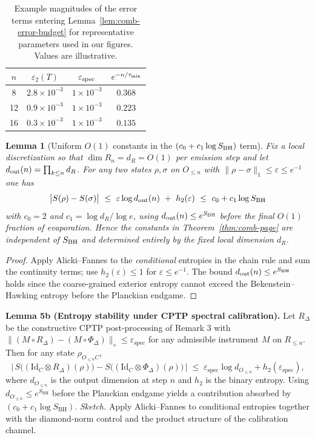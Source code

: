 \documentclass[aps,prd,preprint,onecolumn,superscriptaddress,nofootinbib,longbibliography,floatfix,11pt,showpacs,showkeys]{revtex4-2}
\theoremstyle{plain}
\newtheorem{lemma}[theorem]{Lemma}
\theoremstyle{definition}
\theoremstyle{remark}
\begin{document}
\begin{table}[t]
\centering
\caption{Example magnitudes of the error terms entering Lemma~\ref{lem:comb-error-budget} for representative parameters used in our figures.
Values are illustrative.}
\begin{tabular}{c|ccc}
\hline
$n$ & $\varepsilon_2(T)$ & $\varepsilon_{\rm spec}$ & $e^{-n/\tau_{\rm mix}}$ \\
\hline
8  & $2.8\times 10^{-3}$ & $1\times 10^{-3}$ & $0.368$ \\
12 & $0.9\times 10^{-3}$ & $1\times 10^{-3}$ & $0.223$ \\
16 & $0.3\times 10^{-3}$ & $1\times 10^{-3}$ & $0.135$ \\
\hline
\end{tabular}
\end{table}

\begin{lemma}[Uniform $O(1)$ constants in the $(c_0+c_1\log S_{\rm BH})$ term]\label{lem:log-constants}
Fix a local discretization so that $\dim R_n=d_R=O(1)$ per emission step and let $d_{\rm out}(n)=\prod_{k\le n} d_R$.
For any two states $\rho,\sigma$ on $O_{\le n}$ with $\|\rho-\sigma\|_1\le \varepsilon\le e^{-1}$ one has
\[
\big|S(\rho)-S(\sigma)\big|\ \le\ \varepsilon \log d_{\rm out}(n)\ +\ h_2(\varepsilon)\ \le\ c_0 + c_1 \log S_{\rm BH}
\]
with $c_0=2$ and $c_1=\log d_R/\log e$, using $d_{\rm out}(n)\le e^{S_{\rm BH}}$ before the final $O(1)$ fraction of evaporation.
Hence the constants in Theorem~\ref{thm:comb-page} are independent of $S_{\rm BH}$ and determined entirely by the fixed local dimension $d_R$.
\end{lemma}
\begin{proof}
Apply Alicki--Fannes to the \emph{conditional} entropies in the chain rule and sum the continuity terms; use $h_2(\varepsilon)\le 1$ for $\varepsilon\le e^{-1}$.
The bound $d_{\rm out}(n)\le e^{S_{\rm BH}}$ holds since the coarse-grained exterior entropy cannot exceed the Bekenstein--Hawking entropy before the Planckian endgame.
\end{proof}

\medskip\noindent\textbf{Lemma 5b (Entropy stability under CPTP spectral calibration).}
Let \(R_\Delta\) be the constructive CPTP post-processing of Remark 3 with \(\|(M\!\circ\!R_\Delta)-(M\!\circ\!\Phi_\Delta)\|_\diamond \le \varepsilon_{\mathrm{spec}}\) for any admissible instrument \(M\) on \(R_{\le n}\). Then for any state \(\rho_{O_{\le n}C}\),
\[
  \bigl|\,S\bigl((\mathrm{Id}_C\!\otimes\!R_\Delta)(\rho)\bigr) - S\bigl((\mathrm{Id}_C\!\otimes\!\Phi_\Delta)(\rho)\bigr)\,\bigr|
  \;\le\; \varepsilon_{\mathrm{spec}}\log d_{O_{\le n}} + h_2(\varepsilon_{\mathrm{spec}}),
\]
where \(d_{O_{\le n}}\) is the output dimension at step \(n\) and \(h_2\) is the binary entropy. Using \(d_{O_{\le n}}\le e^{S_{\mathrm{BH}}}\) before the Planckian endgame yields a contribution absorbed by \((c_0 + c_1\log S_{\mathrm{BH}})\).
\emph{Sketch.} Apply Alicki--Fannes to conditional entropies together with the diamond-norm control and the product structure of the calibration channel.
\end{document}
